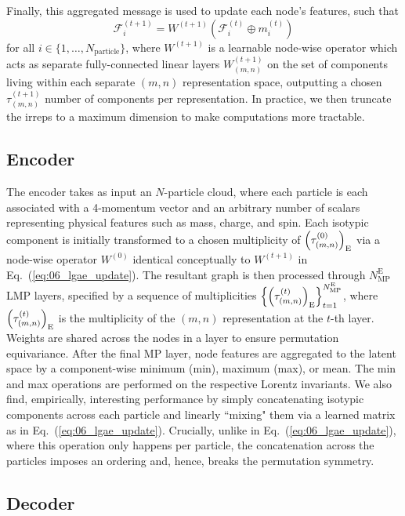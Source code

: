 Finally, this aggregated message is used to update each node's features, such that
\begin{equation} \label{eq:06_lgae_update}
    \mathcal{F}_i^{(t+1)} = W^{(t+1)} \left( \mathcal{F}_i^{(t)} \oplus m_i^{(t)} \right)
\end{equation}
for all $i \in \{1, \ldots, N_\mathrm{particle}\}$, where $W^{(t+1)}$ is a learnable node-wise operator which acts as separate fully-connected linear layers $W^{(t+1)}_{(m, n)}$ on the set of components living within each separate $(m, n)$ representation space, outputting a chosen $\tau_{(m,n)}^{(t+1)}$ number of components per representation.
In practice, we then truncate the irreps to a maximum dimension to make computations more tractable.

\subsection{Encoder \label{sec:06_lgae_lgaee}}
The encoder takes as input an $N$-particle cloud, where each particle is each associated with a 4-momentum vector and an arbitrary number of scalars representing physical features such as mass, charge, and spin. 
Each isotypic component is initially transformed to a chosen multiplicity of $\left( \tau_{(m, n)}^{(0)} \right)_\mathrm{E}$ via a node-wise operator $W^{(0)}$ identical conceptually to $W^{(t+1)}$ in Eq.~(\ref{eq:06_lgae_update}). 
The resultant graph is then processed through $N_{\mathrm{MP}}^\mathrm{E}$ LMP layers, specified by a sequence of multiplicities $\left\{ \left( \tau_{(m, n)}^{(t)} \right)_\mathrm{E} \right\}_{t=1}^{N_{\mathrm{MP}}^\mathrm{E}}$, where $\left( \tau_{(m, n)}^{(t)} \right)_\mathrm{E}$ is the multiplicity of the $(m, n)$ representation at the $t$-th layer. 
Weights are shared across the nodes in a layer to ensure permutation equivariance.
After the final MP layer, node features are aggregated to the latent space by a component-wise minimum (min), maximum (max), or mean. 
The min and max operations are performed on the respective Lorentz invariants.
We also find, empirically, interesting performance by simply concatenating isotypic components across each particle and linearly ``mixing" them via a learned matrix as in Eq.~(\ref{eq:06_lgae_update}). 
Crucially, unlike in Eq.~(\ref{eq:06_lgae_update}), where this operation only happens per particle, the concatenation across the particles imposes an ordering and, hence, breaks the permutation symmetry. 


\subsection{Decoder \label{sec:06_lgae_lgaed}}

